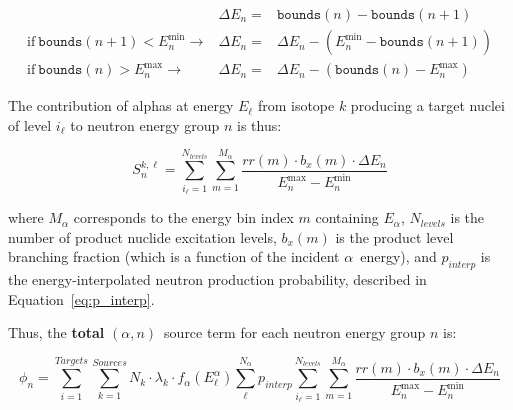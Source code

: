 \documentclass[10pt]{article}
\newcommand{\alphn}[0]{$\left(\alpha,n\right)$}
\begin{document}
\begin{eqnarray}
& \Delta E_n  = & \texttt{bounds}\left(n\right) - \texttt{bounds}\left(n+1\right) \\
\mathrm{if}\ \texttt{bounds}\left(n+1\right) < E_n^{\min} \rightarrow & \Delta E_n = & \Delta E_n - \left(E_n^{\min} - \texttt{bounds}\left(n+1\right) \right) \\
\mathrm{if}\ \texttt{bounds} \left(n\right) > E_n^{\max} \rightarrow & \Delta E_n = & \Delta E_n - \left( \texttt{bounds}\left(n\right) - E_n^{\max} \right) 
\end{eqnarray}

The contribution of alphas at energy $E_\ell$ from isotope $k$ producing a target nuclei of level $i_\ell$ to neutron energy group $n$ is thus:

\begin{equation}
S_n^{k,\ell} =  \sum_{i_\ell=1}^{N_{levels}} \sum_{m=1}^{M_\alpha}  \frac{rr\left(m\right)\cdot b_x \left(m\right) \cdot \Delta E_n }{E_n^{\max} - E_n^{\min}}
\end{equation}

where $M_\alpha$ corresponds to the energy bin index $m$ containing $E_\alpha$, $N_{levels}$ is the number of product nuclide excitation levels, $b_x\left(m\right)$ is the product level branching fraction (which is a function of the incident $\alpha$\ energy), and $p_{interp}$ is the energy-interpolated neutron production probability, described in Equation~\eqref{eq:p_interp}.

Thus, the \textbf{total} \alphn\ source term for each neutron energy group $n$ is:

\begin{equation}
\displaystyle \boxed{ \phi_n = \sum_{i=1}^{Targets} \sum_{k=1}^{Sources} N_k \cdot \lambda_k \cdot f_\alpha \left( E^\alpha_\ell  \right) \sum_{\ell}^{N_{\alpha}}  p_{interp} \sum_{i_\ell=1}^{N_{levels}} \sum_{m=1}^{M_\alpha}  \frac{rr\left(m\right)\cdot b_x \left( m \right) \cdot \Delta E_n }{E_n^{\max} - E_n^{\min}}}
\end{equation}
\end{document}
